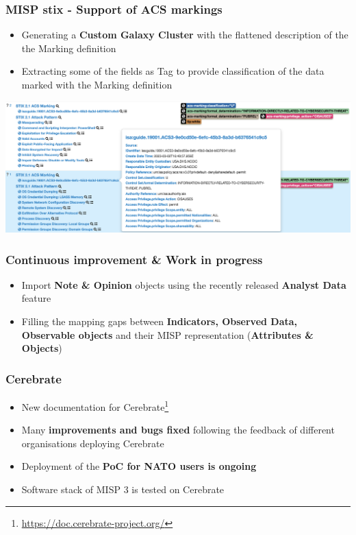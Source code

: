 \begin{frame}
     \frametitle{MISP stix - Support of ACS markings}
     \begin{itemize}
	     \item Generating a {\bf Custom Galaxy Cluster} with the flattened description of the the Marking definition
             \item Extracting some of the fields as Tag to provide classification of the data marked with the Marking definition
     \end{itemize}
	\begin{center}
	    \includegraphics[scale=0.4]{stix-cluster5.png}
        \end{center}
\end{frame}

\begin{frame}
       \frametitle{Continuous improvement \& Work in progress}
	\begin{itemize}
		\item Import {\bf Note \& Opinion} objects using the recently released {\bf Analyst Data} feature
		\item Filling the mapping gaps between {\bf Indicators, Observed Data, Observable objects} and their MISP representation ({\bf Attributes \& Objects})
	\end{itemize}
\end{frame}

\begin{frame}
    \frametitle{Cerebrate}
    \begin{itemize}
        \item New documentation for Cerebrate\footnote{\url{https://doc.cerebrate-project.org/}}
        \item Many {\bf improvements and bugs fixed} following the feedback of different organisations deploying Cerebrate
        \item Deployment of the {\bf PoC for NATO users is ongoing}
        \item Software stack of MISP 3 is tested on Cerebrate
    \end{itemize}

\end{frame}

